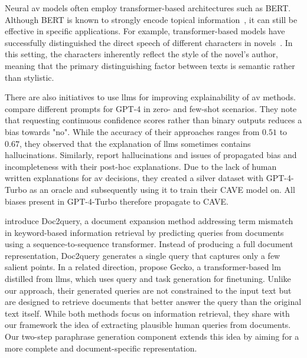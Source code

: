 Neural \ac{av} models often employ transformer-based architectures such as BERT. 
Although BERT is known to strongly encode topical information~\citep{sawatphol_cross_topic_av_24}, it can still be effective in specific applications. 
For example, transformer-based models have successfully distinguished the direct speech of different characters in novels~\citep{michel_fictional_2024}. 
In this setting, the characters inherently reflect the style of the novel’s author, meaning that the primary distinguishing factor between texts is semantic rather than stylistic.

There are also initiatives to use \acp{llm} for improving explainability of \ac{av} methods.
\citet{hung_xai_av_llm_2023} compare different prompts for GPT-4 in zero- and few-shot scenarios.
They note that requesting continuous confidence scores rather than binary outputs reduces a bias towards "no".
While the accuracy of their approaches ranges from $0.51$ to $0.67$, they observed that the explanation of \acp{llm} sometimes contains hallucinations.
Similarly, \citet{ramnath_cave_xai_llm_2025} report hallucinations and issues of propagated bias and incompleteness with their post-hoc explanations.
Due to the lack of human written explanations for \ac{av} decisions, they created a silver dataset with GPT-4-Turbo as an oracle and subsequently using it to train their CAVE model on.
All biases present in GPT-4-Turbo therefore propagate to CAVE.

\citet{nogueira_doc2query_2019} introduce Doc2query, a document expansion method addressing term mismatch in keyword-based information retrieval by predicting queries from documents using a sequence-to-sequence transformer. 
Instead of producing a full document representation, Doc2query generates a single query that captures only a few salient points. 
In a related direction, \citet{lee_gecko_2024} propose Gecko, a transformer-based \ac{lm} distilled from \acp{llm}, which uses query and task generation for finetuning. 
Unlike our approach, their generated queries are not constrained to the input text but are designed to retrieve documents that better answer the query than the original text itself. 
While both methods focus on information retrieval, they share with our framework the idea of extracting plausible human queries from documents. 
Our two-step paraphrase generation component \pextractor{} extends this idea by aiming for a more complete and document-specific representation.

